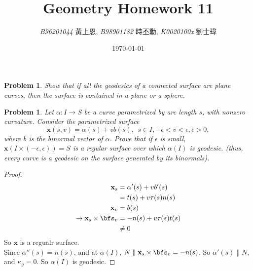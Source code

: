 \documentclass[10pt,a4paper]{article}
\newcommand{\LiHei}{\CJKfamily{lh}}
\newcounter{theProblemCounter}
\newtheorem{problem}[theProblemCounter]{Problem}
\begin{document}
\title{{Geometry Homework 11}}
\author{{\it{B96201044}} {\LiHei 黃上恩}, {\it{B98901182}} {\LiHei 時丕勳}, {\it{K0020100x}} {\LiHei 劉士瑋}}
\date{\today}
\maketitle

\newcommand{\bx}{\mathbb{X}}
\newcommand{\bfx}{\mathbf{x}}
\newcommand{\grad}{\textrm{grad }}
\newcommand{\sech}{\mbox{sech}}

\setcounter{theProblemCounter}{3}
\begin{problem} Show that if all the geodesics of a connected surface are plane curves, then the surface is contained in a plane or a sphere.
\end{problem}

\setcounter{theProblemCounter}{4}
\begin{problem} Let $\alpha: I\to S$ be a curve parametrized by arc length $s$, with nonzero curvature. Consider the parametrized surface
\[ \bfx(s, v) = \alpha(s)+vb(s), \ \ s\in I, -\epsilon<v<\epsilon, \epsilon > 0,\]
where $b$ is the binormal vector of $\alpha$. Prove that if $\epsilon$ is small, $\bfx(I\times (-\epsilon, \epsilon)) = S$ is a regular surface over which $\alpha(I)$ is geodesic. (thus, every curve is a geodesic on the surface generated by its binormals).
\end{problem}
\begin{proof}
\begin{align*}
\bfx_s&=\alpha'(s)+vb'(s)\\
&=t(s)+v\tau(s)n(s)\\
\bfx_v&=b(s)\\
\rightarrow \bfx_s\times\bfs_v&=-n(s)+v\tau(s)t(s)\\
&\neq 0
\end{align*}
So $\bfx$ is a regualr surface.\\
Since $\alpha''(s)=n(s)$, and at $\alpha(I)$, $N\parallel \bfx_s\times\bfs_v=-n(s)$. So $\alpha'(s)\parallel N$, and $\kappa_g=0$. So $\alpha(I)$ is geodesic.
\end{proof}
\end{document}
